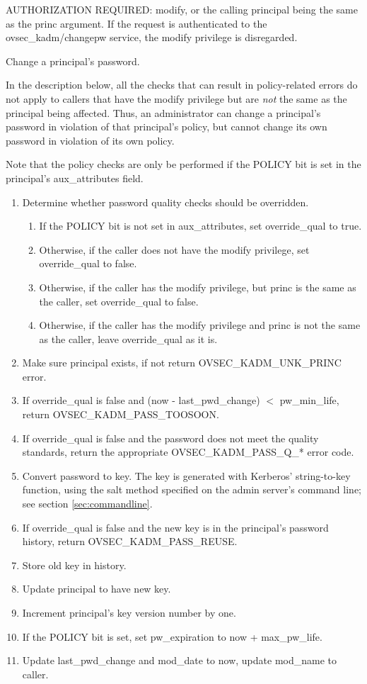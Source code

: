 AUTHORIZATION REQUIRED: modify, or the calling principal being the
same as the princ argument.  If the request is authenticated to the
ovsec_kadm/changepw service, the modify privilege is disregarded.

Change a principal's password.  

In the description below, all the checks that can result in
policy-related errors do not apply to callers that have the modify
privilege but are {\it not} the same as the principal being affected.
Thus, an administrator can change a principal's password in violation
of that principal's policy, but cannot change its own password in
violation of its own policy.

Note that the policy checks are only be performed if the POLICY bit is
set in the principal's aux_attributes field.

\begin{enumerate}
\item Determine whether password quality checks should be overridden.
\begin{enumerate}
\item If the POLICY bit is not set in aux_attributes, set
override_qual to true.
\item Otherwise, if the caller does not have the modify privilege,
set override_qual to false.
\item Otherwise, if the caller has the modify privilege, but princ is the
same as the caller, set override_qual to false.
\item Otherwise, if the caller has the modify privilege and princ is
not the same as the caller, leave override_qual as it is.
\end{enumerate}
\item Make sure principal exists, if not return OVSEC_KADM_UNK_PRINC error.
\item If override_qual is false and (now - last_pwd_change) $<$
pw_min_life, return OVSEC_KADM_PASS_TOOSOON.
\item If override_qual is false and the password does not meet the quality
standards, return the appropriate OVSEC_KADM_PASS_Q_* error code.
\item Convert password to key.  The key is generated with
Kerberos' string-to-key function, using the salt method specified on
the admin server's command line; see section \ref{sec:commandline}.
\item If override_qual is false and the new key is in the principal's
password history, return OVSEC_KADM_PASS_REUSE.
\item Store old key in history.
\item Update principal to have new key.
\item Increment principal's key version number by one.
\item If the POLICY bit is set, set pw_expiration to now + max_pw_life.
\item Update last_pwd_change and mod_date to now, update mod_name to
caller.
\end{enumerate}

